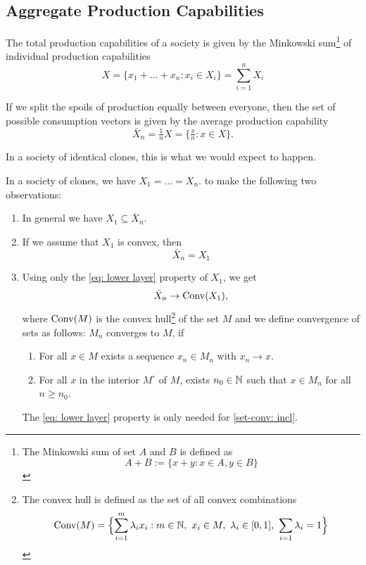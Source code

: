 \subsection{Aggregate Production Capabilities}

The total production capabilities of a society is given by the Minkowski sum\footnote{
	The Minkowski sum of set \(A\) and \(B\) is defined as
	\[
		A + B := \{ x+y : x\in A, y\in B\}
	\]
}
of individual production capabilities
\begin{equation}
	\label{eq: tpc}\tag{TPC}
	X = \{ x_1 + \dots + x_n : x_i \in X_i\} = \sum_{i=1}^n X_i
\end{equation}

If we split the spoils of production equally between everyone, then the set of
possible consumption vectors is given by the average production capability
\begin{equation}
	\label{eq: apc}\tag{APC}
	\bar{X}_n = \tfrac1n X = \{\tfrac{x}n : x\in X\}.
\end{equation}

In a society of identical clones, this is what we would expect to happen.

\begin{lemma}
	In a society of clones, we have \(X_1=\dots = X_n\).
	to make the following two observations:
	\begin{enumerate}
		\item In general we have \(X_1\subseteq \bar{X}_n\).
		\item If we assume that \(X_1\) is convex, then
		\[
			\bar{X}_n = X_1
		\]
		\item Using only the \ref{eq: lower layer} property of \(X_1\), we get
		\[
			\bar{X}_n \to \operatorname{Conv}(X_1),
		\]
		where \(\operatorname{Conv}(M)\) is the convex hull\footnote{
			The convex hull is defined as the set of all convex combinations
			\[
				\conv(M)= \Bigl\{\sum_{i=1}^m \lambda_i x_i : m\in\nat,\ x_i \in M,\ \lambda_i\in[0,1],\ \sum_{i=1}\lambda_i =1\Bigr\}
			\]
		} of the set \(M\) and we define
		convergence of sets as follows: \(M_n\) converges to \(M\), if

		\begin{enumerate}
			\item\label{set-conv: seq} For all \(x\in M\) exists a sequence
			\(x_n\in M_n\) with \(x_n\to x\).

			\item\label{set-conv: incl} For all \(x\) in the interior \(M^\circ\)
			of \(M\), exists \(n_0\in\mathbb{N}\) such that \(x\in M_n\) for all \(n\ge
			n_0\).
		\end{enumerate}
		The \ref{eq: lower layer} property is only needed for \ref{set-conv:
		incl}.
	\end{enumerate}
\end{lemma}


